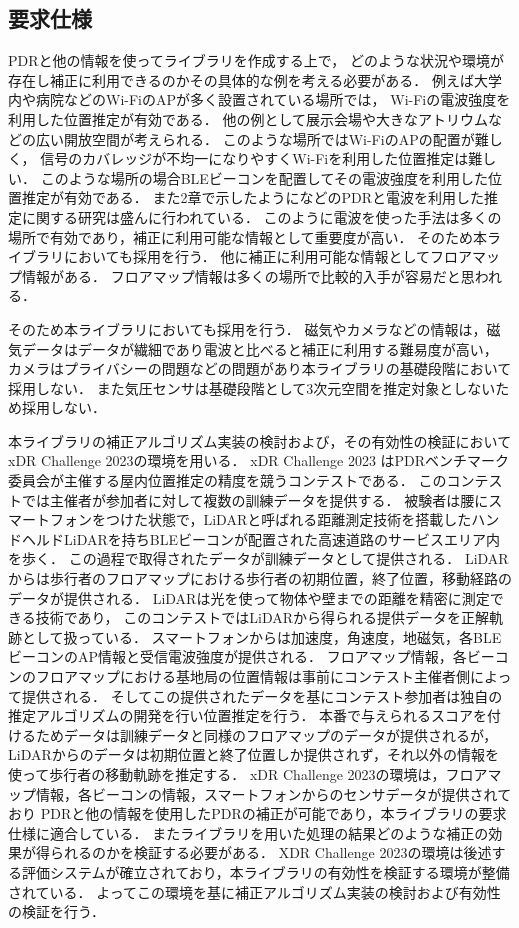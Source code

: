

\subsection{要求仕様}                                      
PDRと他の情報を使ってライブラリを作成する上で，
どのような状況や環境が存在し補正に利用できるのかその具体的な例を考える必要がある．
例えば大学内や病院などのWi-FiのAPが多く設置されている場所では，
Wi-Fiの電波強度を利用した位置推定が有効である．
他の例として展示会場や大きなアトリウムなどの広い開放空間が考えられる．
このような場所ではWi-FiのAPの配置が難しく，
信号のカバレッジが不均一になりやすくWi-Fiを利用した位置推定は難しい．
このような場所の場合BLEビーコンを配置してその電波強度を利用した位置推定が有効である．
また2章で示したように\cite{pdr-wifi}\cite{pdr-ble}などのPDRと電波を利用した推定に関する研究は盛んに行われている．
このように電波を使った手法は多くの場所で有効であり，補正に利用可能な情報として重要度が高い．
そのため本ライブラリにおいても採用を行う．
他に補正に利用可能な情報としてフロアマップ情報がある．
フロアマップ情報は多くの場所で比較的入手が容易だと思われる．

そのため本ライブラリにおいても採用を行う．
磁気やカメラなどの情報は，磁気データはデータが繊細であり電波と比べると補正に利用する難易度が高い，
カメラはプライバシーの問題などの問題があり本ライブラリの基礎段階において採用しない．
また気圧センサは基礎段階として3次元空間を推定対象としないため採用しない．

本ライブラリの補正アルゴリズム実装の検討および，その有効性の検証においてxDR Challenge 2023\cite{xdr}の環境を用いる．
xDR Challenge 2023 はPDRベンチマーク委員会が主催する屋内位置推定の精度を競うコンテストである．
このコンテストでは主催者が参加者に対して複数の訓練データを提供する．
被験者は腰にスマートフォンをつけた状態で，LiDARと呼ばれる距離測定技術を搭載したハンドヘルドLiDARを持ちBLEビーコンが配置された高速道路のサービスエリア内を歩く．
この過程で取得されたデータが訓練データとして提供される．
LiDARからは歩行者のフロアマップにおける歩行者の初期位置，終了位置，移動経路のデータが提供される．
LiDARは光を使って物体や壁までの距離を精密に測定できる技術であり，
このコンテストではLiDARから得られる提供データを正解軌跡として扱っている．
スマートフォンからは加速度，角速度，地磁気，各BLEビーコンのAP情報と受信電波強度が提供される．
フロアマップ情報，各ビーコンのフロアマップにおける基地局の位置情報は事前にコンテスト主催者側によって提供される．
そしてこの提供されたデータを基にコンテスト参加者は独自の推定アルゴリズムの開発を行い位置推定を行う．
本番で与えられるスコアを付けるためデータは訓練データと同様のフロアマップのデータが提供されるが，
LiDARからのデータは初期位置と終了位置しか提供されず，それ以外の情報を使って歩行者の移動軌跡を推定する．
xDR Challenge 2023の環境は，フロアマップ情報，各ビーコンの情報，スマートフォンからのセンサデータが提供されており
PDRと他の情報を使用したPDRの補正が可能であり，本ライブラリの要求仕様に適合している．
またライブラリを用いた処理の結果どのような補正の効果が得られるのかを検証する必要がある．
XDR Challenge 2023の環境は後述する評価システムが確立されており，本ライブラリの有効性を検証する環境が整備されている．
よってこの環境を基に補正アルゴリズム実装の検討および有効性の検証を行う．

